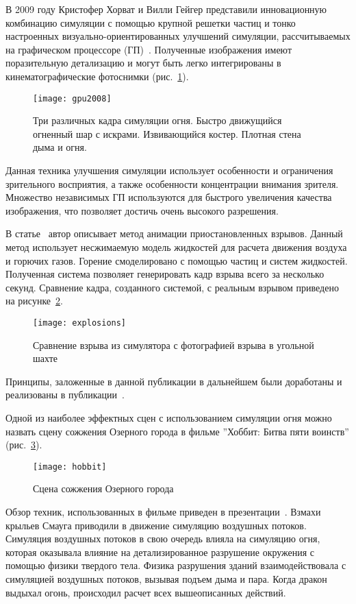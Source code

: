 В 2009 году Кристофер Хорват и Вилли Гейгер представили инновационную комбинацию
симуляции с помощью крупной решетки частиц и тонко настроенных
визуально-ориентированных улучшений симуляции, рассчитываемых на графическом
процессоре (ГП)~\cite{Stock2008}. Полученные изображения
имеют поразительную детализацию и могут быть легко интегрированы в
кинематографические фотоснимки (рис.~\ref{fig:gpu2008}).
\begin{figure}[htb]
	\centering
	\texttt{[image: gpu2008]}
	\caption{Три различных кадра симуляции огня. Быстро движущийся огненный
	шар с искрами. Извивающийся костер. Плотная стена дыма и огня.}%
    \label{fig:gpu2008}
\end{figure}
Данная техника улучшения симуляции использует особенности и ограничения
зрительного восприятия, а также особенности концентрации внимания зрителя.
Множество независимых ГП используются для быстрого увеличения качества
изображения, что позволяет достичь очень высокого разрешения.

В статье~\cite{suspendedExplosions} автор описывает метод анимации
приостановленных взрывов. Данный метод использует несжимаемую модель жидкостей
для расчета движения воздуха и горючих газов. Горение смоделировано с помощью
частиц и систем жидкостей. Полученная система позволяет генерировать кадр взрыва
всего за несколько секунд. Сравнение кадра, созданного системой, с реальным
взрывом приведено на рисунке~\ref{fig:explosions}.
\begin{figure}[htb]
	\centering
	\texttt{[image: explosions]}
	\caption{Сравнение взрыва из симулятора с фотографией взрыва в угольной
    шахте}%
    \label{fig:explosions}
\end{figure}
Принципы, заложенные в данной публикации в дальнейшем были доработаны и
реализованы в публикации~\cite{VortexExplosions}.

Одной из наиболее эффектных сцен с использованием симуляции огня можно назвать
сцену сожжения Озерного города в фильме ''Хоббит: Битва пяти воинств''
(рис.~\ref{fig:hobbit}).
\begin{figure}[htb]
    \centering
    \texttt{[image: hobbit]}
    \caption{Сцена сожжения Озерного города}%
    \label{fig:hobbit}
\end{figure}
Обзор техник, использованных в фильме приведен в
презентации~\cite{hobbitSlides}. Взмахи крыльев Смауга приводили в движение
симуляцию воздушных потоков. Симуляция воздушных потоков в свою очередь влияла
на симуляцию огня, которая оказывала влияние на детализированное разрушение
окружения с помощью физики твердого тела. Физика разрушения зданий
взаимодействовала с симуляцией воздушных потоков, вызывая подъем дыма и пара.
Когда дракон выдыхал огонь, происходил расчет всех вышеописанных действий.

